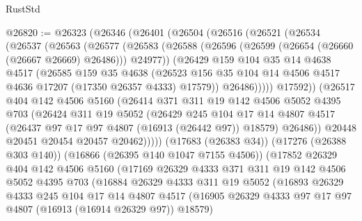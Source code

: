 \begin{lexlean}{RustStd}
\begin{coremodule}
@26820 := @26323
    (@26346
      (@26401
        (@26504
          (@26516
            (@26521
              (@26534
                (@26537
                  (@26563
                    (@26577
                      (@26583
                        (@26588 (@26596 (@26599 (@26654 (@26660 (@26667 @26669) @26486))) @24977))
                        (@26429
                          @159
                          @104
                          @35
                          @14
                          @4638
                          @4517
                          (@26585
                            @159
                            @35
                            @4638
                            (@26523
                              @156
                              @35
                              @104
                              @14
                              @4506
                              @4517
                              @4636
                              @17207
                              (@17350 @26357 @4333)
                              @17579))
                          @26486)))))
                @17592))
            (@26517
              @404
              @142
              @4506
              @5160
              (@26414
                @371
                @311
                @19
                @142
                @4506
                @5052
                @4395
                @703
                (@26424
                  @311
                  @19
                  @5052
                  (@26429
                    @245
                    @104
                    @17
                    @14
                    @4807
                    @4517
                    (@26437 @97 @17 @97 @4807 (@16913 (@26442 @97)) @18579)
                    @26486))
                @20448
                @20451
                @20454
                @20457
                @20462)))))
      (@17683 (@26383 @34))
      (@17276 (@26388 @303 @140))
      (@16866 (@26395 @140 @1047 @7155 @4506))
      (@17852
        @26329
        @404
        @142
        @4506
        @5160
        (@17169
          @26329
          @4333
          @371
          @311
          @19
          @142
          @4506
          @5052
          @4395
          @703
          (@16884
            @26329
            @4333
            @311
            @19
            @5052
            (@16893
              @26329
              @4333
              @245
              @104
              @17
              @14
              @4807
              @4517
              (@16905 @26329 @4333 @97 @17 @97 @4807 (@16913 (@16914 @26329 @97)) @18579)

\end{coremodule}
\end{lexlean}
